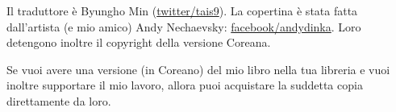Il traduttore è Byungho Min (\href{http://go.yurichev.com/17344}{twitter/tais9}).
La copertina è stata fatta dall'artista (e mio amico) Andy Nechaevsky:
\href{http://go.yurichev.com/17023}{facebook/andydinka}.
Loro detengono inoltre il copyright della versione Coreana.

Se vuoi avere una versione  (in Coreano) del mio libro nella tua libreria e 
vuoi inoltre supportare il mio lavoro, allora puoi acquistare la suddetta copia direttamente da loro.


